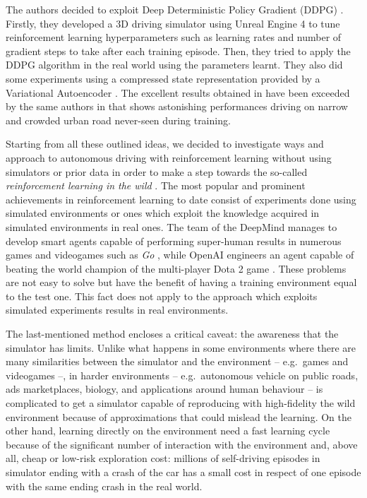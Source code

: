 The authors decided to exploit Deep Deterministic Policy Gradient (DDPG) \cite{lillicrap2015continuous}.
Firstly, they developed a 3D driving simulator using Unreal Engine 4 to tune reinforcement learning hyperparameters such as learning rates and number of gradient steps to take after each training episode.
Then, they tried to apply the DDPG algorithm in the real world using the parameters learnt.
They also did some experiments using a compressed state representation provided by a Variational Autoencoder \cite{kingma2013auto,rezende2014stochastic}.
The excellent results obtained in \cite{kendall2019learning} have been exceeded by the same authors in \cite{wayve2019human} that shows astonishing performances driving on narrow and crowded urban road never-seen during training.


Starting from all these outlined ideas, we decided to investigate ways and approach to autonomous driving with reinforcement learning without using simulators or prior data in order to make a step towards the so-called \textit{reinforcement learning in the wild} \cite{chara2018wild}.
The most popular and prominent achievements in reinforcement learning to date consist of experiments done using simulated environments or ones which exploit the knowledge acquired in simulated environments in real ones.
The team of the DeepMind manages to develop smart agents capable of performing super-human results in numerous games and videogames such as \textit{Go} \cite{silver2016mastering,silver2017mastering}, while OpenAI engineers an agent capable of beating the world champion of the multi-player Dota 2 game \cite{openai2018dota,openai2019dota}.
These problems are not easy to solve but have the benefit of having a training environment equal to the test one.
This fact does not apply to the approach which exploits simulated experiments results in real environments.

The last-mentioned method encloses a critical caveat: the awareness that the simulator has limits.
Unlike what happens in some environments where there are many similarities between the simulator and the environment -- e.g.\ games and videogames --, in harder environments -- e.g.\ autonomous vehicle on public roads, ads marketplaces, biology, and applications around human behaviour -- is complicated to get a simulator capable of reproducing with high-fidelity the wild environment because of approximations that could mislead the learning.
On the other hand, learning directly on the environment need a fast learning cycle because of the significant number of interaction with the environment and, above all, cheap or low-risk exploration cost: millions of self-driving episodes in simulator ending with a crash of the car has a small cost in respect of one episode with the same ending crash in the real world.

